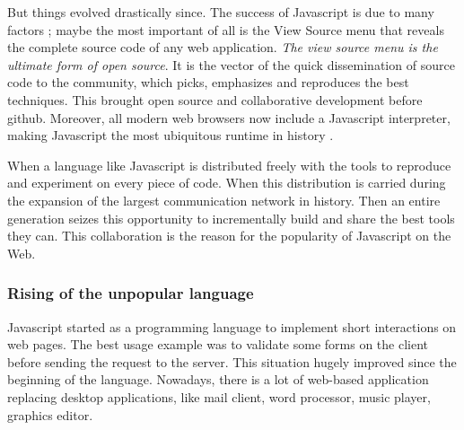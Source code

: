 But things evolved drastically since.
The success of Javascript is due to many factors ; maybe the most important of all is the View Source menu that reveals the complete source code of any web application.
\textit{The view source menu is the ultimate form of open source}.
It is the vector of the quick dissemination of source code to the community, which picks, emphasizes and reproduces the best techniques.
This brought open source and collaborative development before github. 
Moreover, all modern web browsers now include a Javascript interpreter, making Javascript the most ubiquitous runtime in history \cite{Flanagan2006}.

When a language like Javascript is distributed freely with the tools to reproduce and experiment on every piece of code.
When this distribution is carried during the expansion of the largest communication network in history.
Then an entire generation seizes this opportunity to incrementally build and share the best tools they can.
This collaboration is the reason for the popularity of Javascript on the Web.

\subsubsection{Rising of the unpopular language}


Javascript started as a programming language to implement short interactions on web pages.
The best usage example was to validate some forms on the client before sending the request to the server.
This situation hugely improved since the beginning of the language.
Nowadays, there is a lot of web-based application replacing desktop applications, like mail client, word processor, music player, graphics editor.

